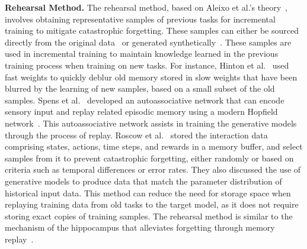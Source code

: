 \documentclass[journal,hideappendix]{vgtc}
\newenvironment{j_itemize}{
\begin{itemize}[]
  \setlength{\itemsep}{3pt}
  \setlength{\parskip}{0pt}
  \setlength{\parsep}{0pt}
}{\end{itemize}}
\begin{document}
\begin{j_itemize}

    \item[$\bullet$] \textbf{Rehearsal Method.} The rehearsal method, based on Aleixo et al.'s theory~\cite{aleixo2023catastrophic}, involves obtaining representative samples of previous tasks for incremental training to mitigate catastrophic forgetting. These samples can either be sourced directly from the original data~\cite{hinton1987using,lopez2017gradient,nguyen2018variational,de2019episodic,prabhu2020gdumb,roscow2021learning} or generated synthetically~\cite{mellado2017pseudorehearsal,zhu2021prototype,roscow2021learning,spens2024generative}. These samples are used in incremental training to maintain knowledge learned in the previous training process when training on new tasks. For instance, Hinton et al.~\cite{hinton1987using} used fast weights to quickly deblur old memory stored in slow weights that have been blurred by the learning of new samples, based on a small subset of the old samples. Spens et al.~\cite{spens2024generative} developed an autoassociative network that can encode sensory input and replay related episodic memory using a modern Hopfield network~\cite{ramsauer2020hopfield}. This autoassociative network assists in training the generative models through the process of replay. Roscow et al.~\cite{roscow2021learning} stored the interaction data comprising states, actions, time steps, and rewards in a memory buffer, and select samples from it to prevent catastrophic forgetting, either randomly or based on criteria such as temporal differences or error rates. They also discussed the use of generative models to produce data that match the parameter distribution of historical input data. This method can reduce the need for storage space when replaying training data from old tasks to the target model, as it does not require storing exact copies of training samples. The rehearsal method is similar to the mechanism of the hippocampus that alleviates forgetting through memory replay~\cite{ji2007coordinated,olafsdottir2018role}.


\end{j_itemize}
\end{document}
